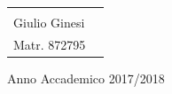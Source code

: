 \begin{titlepage}
\begin{center}
\begin{minipage}{.99\linewidth}
\begin{tabular}{l r}
\begin{minipage}{.5\linewidth}
\begin{flushleft}
          \end{flushleft}
        \end{minipage}
        &
        \begin{minipage}{.45\linewidth}
          \begin{flushright}
            {\large
              TESI DI LAUREA DI\\[.3cm]
              Giulio Ginesi\\[.45cm]
              Matr. 872795
            }
          \end{flushright}
        \end{minipage}
      \end{tabular}
    \end{minipage}

    \vfill
    {\large{{Anno Accademico 2017/2018}}}
  \end{center}
\end{titlepage}


